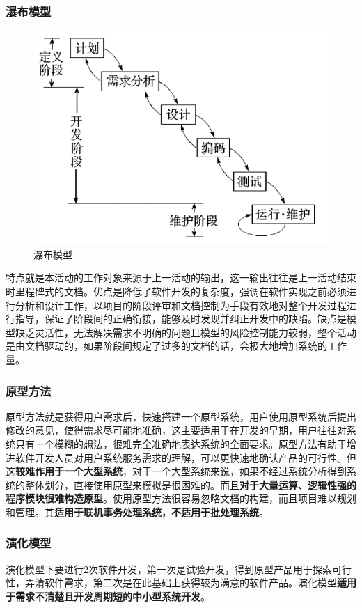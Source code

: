 \documentclass[chapter.computer_science.tex]{subfiles}
\begin{document}
\subsubsection{瀑布模型}
\begin{figure}[H]
    \centering
    \includegraphics[scale=0.5]{./images/0032.png}
    \caption{瀑布模型}
\end{figure}
特点就是本活动的工作对象来源于上一活动的输出，这一输出往往是上一活动结束时里程碑式的文档。优点是降低了软件开发的复杂度，强调在软件实现之前必须进行分析和设计工作，以项目的阶段评审和文档控制为手段有效地对整个开发过程进行指导，保证了阶段间的正确衔接，能够及时发现并纠正开发中的缺陷。缺点是模型缺乏灵活性，无法解决需求不明确的问题且模型的风险控制能力较弱，整个活动是由文档驱动的，如果阶段间规定了过多的文档的话，会极大地增加系统的工作量。
\subsubsection{原型方法}
原型方法就是获得用户需求后，快速搭建一个原型系统，用户使用原型系统后提出修改的意见，使得需求尽可能地准确，这主要适用于在开发的早期，用户往往对系统只有一个模糊的想法，很难完全准确地表达系统的全面要求。原型方法有助于增进软件开发人员对用户系统服务需求的理解，可以更快速地确认产品的可行性。但这{\bfseries 较难作用于一个大型系统}，对于一个大型系统来说，如果不经过系统分析得到系统的整体划分，直接使用原型来模拟是很困难的。而且{\bfseries 对于大量运算、逻辑性强的程序模块很难构造原型}。使用原型方法很容易忽略文档的构建，而且项目难以规划和管理。其{\bfseries 适用于联机事务处理系统，不适用于批处理系统}。\\
\subsubsection{演化模型}
演化模型下要进行2次软件开发，第一次是试验开发，得到原型产品用于探索可行性，弄清软件需求，第二次是在此基础上获得较为满意的软件产品。演化模型{\bfseries 适用于需求不清楚且开发周期短的中小型系统开发}。
\end{document}
